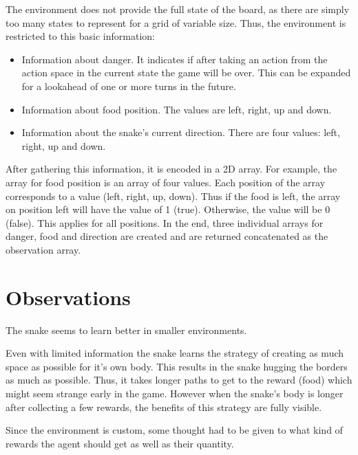 \documentclass[lettersize,journal]{IEEEtran}
\begin{document}
The environment does not provide the full state of the board,
as there are simply too many states to represent for a grid
of variable size. Thus, the environment is restricted to
this basic information:
\begin{itemize}
    \item Information about danger. It indicates if after taking an action from the action space in the current state
        the game will be over. This can be expanded for a lookahead of one or more turns in the future.
    \item Information about food position. The values are left, right, up and down.
    \item Information about the snake's current direction. There are four values: left, right, up and down.
\end{itemize}

After gathering this information, it is encoded in a 2D array. For example, the array for food position
is an array of four values. Each position of the array corresponds to a value (left, right, up, down).
Thus if the food is left, the array on position left will have the value of 1 (true). Otherwise, the
value will be 0 (false). This applies for all positions. In the end, three individual arrays for danger,
food and direction are created and are returned concatenated as the observation array.

\section{Observations}
The snake seems to learn better in smaller environments.

Even with limited information the snake learns the strategy
of creating as much space as possible for it's own body.
This results in the snake hugging the borders as much
as possible.
Thus, it takes longer paths to get to the reward (food) which
might seem strange early in the game.
However when the snake's body is longer after collecting a
few rewards, the benefits of this strategy are fully visible.


Since the environment is custom, some thought had to be given
to what kind of rewards the agent should get as well as their
quantity.


\end{document}
